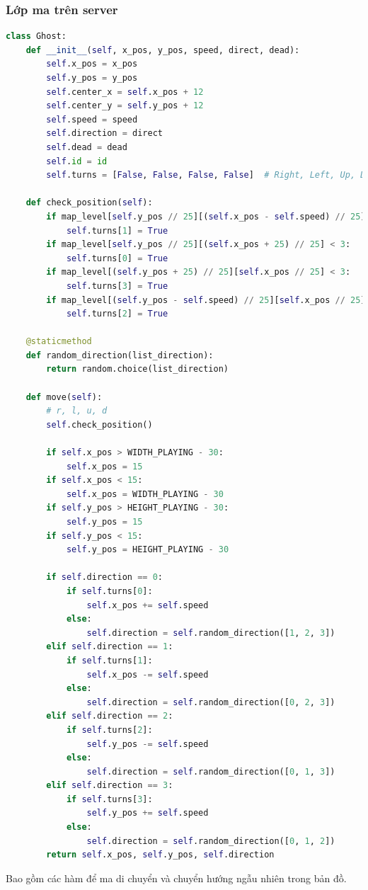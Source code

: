 \documentclass[a4paper]{article}
\begin{document}
\subsubsection{Lớp ma trên server}
\begin{lstlisting}[language=Python]
class Ghost:
    def __init__(self, x_pos, y_pos, speed, direct, dead):
        self.x_pos = x_pos
        self.y_pos = y_pos
        self.center_x = self.x_pos + 12
        self.center_y = self.y_pos + 12
        self.speed = speed
        self.direction = direct
        self.dead = dead
        self.id = id
        self.turns = [False, False, False, False]  # Right, Left, Up, Down

    def check_position(self):
        if map_level[self.y_pos // 25][(self.x_pos - self.speed) // 25] < 3:
            self.turns[1] = True
        if map_level[self.y_pos // 25][(self.x_pos + 25) // 25] < 3:
            self.turns[0] = True
        if map_level[(self.y_pos + 25) // 25][self.x_pos // 25] < 3:
            self.turns[3] = True
        if map_level[(self.y_pos - self.speed) // 25][self.x_pos // 25] < 3:
            self.turns[2] = True

    @staticmethod
    def random_direction(list_direction):
        return random.choice(list_direction)

    def move(self):
        # r, l, u, d
        self.check_position()

        if self.x_pos > WIDTH_PLAYING - 30:
            self.x_pos = 15
        if self.x_pos < 15:
            self.x_pos = WIDTH_PLAYING - 30
        if self.y_pos > HEIGHT_PLAYING - 30:
            self.y_pos = 15
        if self.y_pos < 15:
            self.y_pos = HEIGHT_PLAYING - 30

        if self.direction == 0:
            if self.turns[0]:
                self.x_pos += self.speed
            else:
                self.direction = self.random_direction([1, 2, 3])
        elif self.direction == 1:
            if self.turns[1]:
                self.x_pos -= self.speed
            else:
                self.direction = self.random_direction([0, 2, 3])
        elif self.direction == 2:
            if self.turns[2]:
                self.y_pos -= self.speed
            else:
                self.direction = self.random_direction([0, 1, 3])
        elif self.direction == 3:
            if self.turns[3]:
                self.y_pos += self.speed
            else:
                self.direction = self.random_direction([0, 1, 2])
        return self.x_pos, self.y_pos, self.direction
\end{lstlisting}
Bao gồm các hàm để ma di chuyển và chuyển hướng ngẫu nhiên trong bản đồ.
\end{document}
